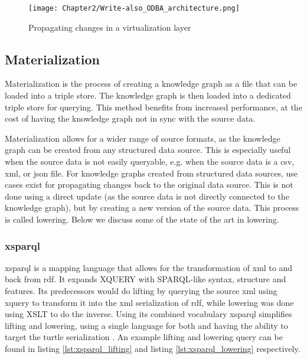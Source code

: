 \begin{figure}
    \centering
    \texttt{[image: Chapter2/Write-also\_ODBA\_architecture.png]}
    \caption{Propagating changes in a virtualization layer \citep{unbehauen-k-2017--sparqlUpdate} }
    \label{fig:virtualization_update}
\end{figure}

\subsection{Materialization}
Materialization is the process of creating a knowledge graph as a file that can be loaded into a triple store. The knowledge graph is then loaded into a dedicated triple store for querying. This method benefits from increased performance, at the cost of having the knowledge graph not in sync with the source data.

Materialization allows for a wider range of source formats, as the knowledge graph can be created from any structured data source. This is especially useful when the source data is not easily queryable, e.g. when the source data is a \acrshort{csv}, \acrshort{xml}, or \acrshort{json} file. For knowledge graphs created from structured data sources, use cases exist for propagating changes back to the original data source. This is not done using a direct update (as the source data is not directly connected to the knowledge graph), but by creating a new version of the source data. This process is called lowering. Below we discuss some of the state of the art in lowering.

\subsubsection{\acrshort*{xsparql}}
\acrshort{xsparql} is a mapping language that allows for the transformation of \acrshort{xml} to and back from \acrshort{rdf}. It expands XQUERY with SPARQL-like syntax, structure and features. Its predecessors would do lifting by querying the source \acrshort{xml} using \acrshort{xquery} to transform it into the \acrshort{xml} serialization of \acrshort{rdf}, while lowering was done using XSLT to do the inverse. Using its combined vocabulary \acrshort{xsparql} simplifies lifting and lowering, using a single language for both and having the ability to target the turtle serialization \citep{xsparql}. An example lifting and lowering query can be found in listing \ref{lst:xsparql_lifting} and listing \ref{lst:xsparql_lowering} respectively.

